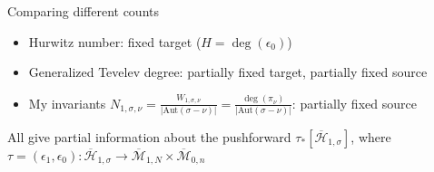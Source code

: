 \documentclass{beamer}
\newcommand{\Aut}{\text{Aut}}
\theoremstyle{definition}
\begin{document}
\begin{frame}{Comparing different counts}
\begin{itemize}
                                                                                                                                                                                                                              \item Hurwitz number: fixed {\color{red}target} ($H=\deg(\epsilon_0)$)
                                                                                                                                                                                                                              \item Generalized Tevelev degree: partially fixed {\color{red}target}, partially fixed {\color{green!70!black}source}
                                                                                                                                                                                                                                \item My invariants $N_{1,\sigma,\nu}=\frac{W_{1,\sigma,\nu}}{|\Aut(\sigma-\nu)|}=\frac{\deg(\pi_{\nu})}{|\Aut(\sigma-\nu)|}$: partially fixed {\color{green!70!black}source}
  
                                                                                                                                                                                                                            \end{itemize}
                                                                                                                                                                                                                            All give partial information about the pushforward $\tau_*[\overline{\mathcal H}_{1,\sigma}]$, where
                                                                                                                                                                                                                            $\tau=(\epsilon_1,\epsilon_0):\overline{\mathcal H}_{1,\sigma}\to\overline{\mathcal M}_{1,N}\times\overline{\mathcal M}_{0,n}$
                                                                                                                                                                                                                          \end{frame}

\end{document}
